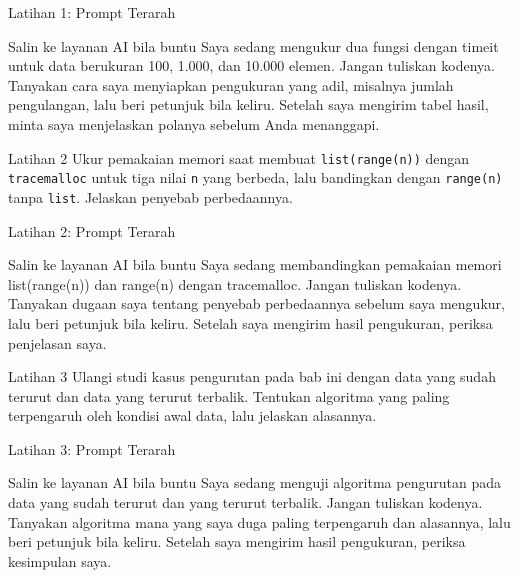 \documentclass[aspectratio=169, table]{beamer}
\begin{document}
\begin{frame}{Latihan 1: Prompt Terarah}
\begin{block}{Salin ke layanan AI bila buntu}
\small Saya sedang mengukur dua fungsi dengan timeit untuk data berukuran 100, 1.000, dan 10.000 elemen. Jangan tuliskan kodenya. Tanyakan cara saya menyiapkan pengukuran yang adil, misalnya jumlah pengulangan, lalu beri petunjuk bila keliru. Setelah saya mengirim tabel hasil, minta saya menjelaskan polanya sebelum Anda menanggapi.
\end{block}
\end{frame}

\begin{frame}[fragile,allowframebreaks=0.8]{Latihan 2}
\footnotesize
Ukur pemakaian memori saat membuat \texttt{list(range(n))} dengan \texttt{tracemalloc} untuk tiga nilai \texttt{n} yang berbeda, lalu bandingkan dengan \texttt{range(n)} tanpa \texttt{list}. Jelaskan penyebab perbedaannya.
\end{frame}

\begin{frame}{Latihan 2: Prompt Terarah}
\begin{block}{Salin ke layanan AI bila buntu}
\small Saya sedang membandingkan pemakaian memori list(range(n)) dan range(n) dengan tracemalloc. Jangan tuliskan kodenya. Tanyakan dugaan saya tentang penyebab perbedaannya sebelum saya mengukur, lalu beri petunjuk bila keliru. Setelah saya mengirim hasil pengukuran, periksa penjelasan saya.
\end{block}
\end{frame}

\begin{frame}[fragile,allowframebreaks=0.8]{Latihan 3}
\footnotesize
Ulangi studi kasus pengurutan pada bab ini dengan data yang sudah terurut dan data yang terurut terbalik. Tentukan algoritma yang paling terpengaruh oleh kondisi awal data, lalu jelaskan alasannya.
\end{frame}

\begin{frame}{Latihan 3: Prompt Terarah}
\begin{block}{Salin ke layanan AI bila buntu}
\small Saya sedang menguji algoritma pengurutan pada data yang sudah terurut dan yang terurut terbalik. Jangan tuliskan kodenya. Tanyakan algoritma mana yang saya duga paling terpengaruh dan alasannya, lalu beri petunjuk bila keliru. Setelah saya mengirim hasil pengukuran, periksa kesimpulan saya.
\end{block}
\end{frame}
\end{document}
